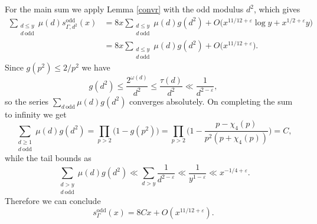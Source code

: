 \documentclass[12pt]{amsart}
\theoremstyle{remark}
\begin{document}
For the main sum we apply Lemma \ref{convr} with the odd modulus $d^2$, which gives
\[
    \begin{split}
        \sum_{\substack{d \le y\\ d\ \mathrm{odd}}} \mu(d) s_{\Gamma, d^2}^{\text{odd}}(x) &= 8x \sum_{\substack{d\le y\\ d\ \text{odd}}} \mu(d) g(d^2) + O\bigl(x^{11/12+\varepsilon} \log y + x^{1/2+\varepsilon}y\bigr)\\
        &= 8x \sum_{\substack{d\le y\\ d\ \text{odd}}} \mu(d) g(d^2) + O\bigl(x^{11/12+\varepsilon}\bigr).
    \end{split}
\]
Since $g(p^2) \le 2/p^2$ we have
\[
    g(d^2) \le \frac{2^{\omega(d)}}{d^{2}} \le \frac{\tau(d)}{d^2} \ll \frac{1}{d^{2-\varepsilon}},
\]
so the series $\sum_{d\ \mathrm{odd}}\mu(d)g(d^2)$ converges absolutely.
On completing the sum to infinity we get
\[
    \sum_{\substack{d \ge 1\\ d\ \text{odd}}}\mu(d)g(d^2) = \prod_{p > 2} \bigl(1-g(p^2)\bigr) = \prod_{p > 2}\biggl(1-\frac{p-\chi_4(p)}{p^2(p+\chi_4(p))}\biggr)=C,
\]
while the tail bounds as
\[
    \sum_{\substack{d > y \\ d\ \text{odd}}}\mu(d)g(d^2) \ll \sum_{d > y} \frac{1}{d^{2-\varepsilon}} \ll \frac{1}{y^{1-\varepsilon}} \ll x^{-1/4+\varepsilon}.
\]
Therefore we  can conclude
\begin{equation} \label{sq-free-odd-contrib}
    s_{\Gamma}^{\text{odd}}(x) = 8Cx + O(x^{11/12+\varepsilon}).
\end{equation}
\end{document}
